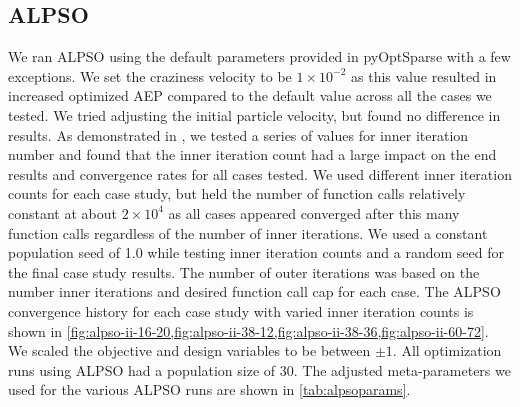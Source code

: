 \documentclass[journal abbreviation, manuscript]{copernicus}
\begin{document}
	\subsection{ALPSO} 
	We ran ALPSO using the default parameters provided in pyOptSparse \cite{wu2020} with a few exceptions.
	We set the craziness velocity to be $1\times10^{-2}$ as this value resulted in increased optimized AEP compared to the default value across all the cases we tested. We tried adjusting the initial particle velocity, but found no difference in results. As demonstrated in \cite{jansen2011_alpso}, we tested a series of values for inner iteration number and found that the inner iteration count had a large impact on the end results and convergence rates for all cases tested. We used different inner iteration counts for each case study, but held the number of function calls relatively constant at about $2\times 10^4$ as all cases appeared converged after this many function calls regardless of the number of inner iterations. We used a constant population seed of 1.0 while testing inner iteration counts and a random seed for the final case study results. The number of outer iterations was based on the number inner iterations and desired function call cap for each case. The ALPSO convergence history for each case study with varied inner iteration counts is shown in \ref{fig:alpso-ii-16-20,fig:alpso-ii-38-12,fig:alpso-ii-38-36,fig:alpso-ii-60-72}. We scaled the objective and design variables to be between $\pm1$.  All optimization runs using ALPSO had a population size of 30. The adjusted meta-parameters we used for the various ALPSO runs are shown in \ref{tab:alpsoparams}.
	
\end{document}
